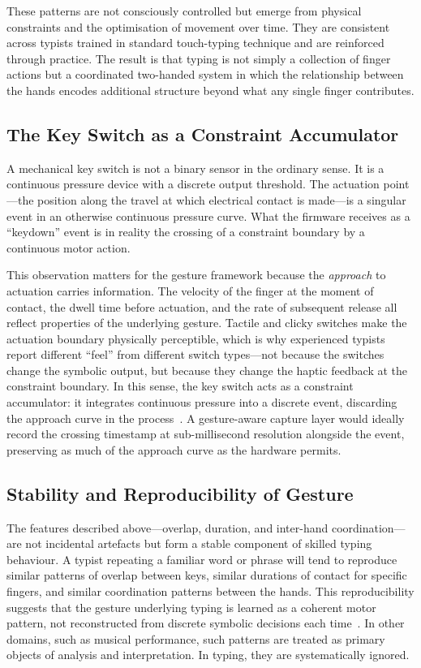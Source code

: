 \documentclass[11pt, a4paper]{article}
\begin{document}
These patterns are not consciously controlled but emerge from physical
constraints and the optimisation of movement over time. They are
consistent across typists trained in standard touch-typing technique and
are reinforced through practice. The result is that typing is not simply
a collection of finger actions but a coordinated two-handed system in
which the relationship between the hands encodes additional structure
beyond what any single finger contributes.

\subsection{The Key Switch as a Constraint Accumulator}

A mechanical key switch is not a binary sensor in the ordinary sense. It
is a continuous pressure device with a discrete output threshold. The
actuation point---the position along the travel at which electrical
contact is made---is a singular event in an otherwise continuous
pressure curve. What the firmware receives as a ``keydown'' event is in
reality the crossing of a constraint boundary by a continuous motor
action.

This observation matters for the gesture framework because the
\emph{approach} to actuation carries information. The velocity of the
finger at the moment of contact, the dwell time before actuation, and
the rate of subsequent release all reflect properties of the underlying
gesture. Tactile and clicky switches make the actuation boundary
physically perceptible, which is why experienced typists report different
``feel'' from different switch types---not because the switches change
the symbolic output, but because they change the haptic feedback at the
constraint boundary. In this sense, the key switch acts as a
constraint accumulator: it integrates continuous pressure into a
discrete event, discarding the approach curve in the
process~\cite{juarrero1999}. A
gesture-aware capture layer would ideally record the crossing timestamp
at sub-millisecond resolution alongside the event, preserving as much
of the approach curve as the hardware permits.

\subsection{Stability and Reproducibility of Gesture}

The features described above---overlap, duration, and inter-hand
coordination---are not incidental artefacts but form a stable component
of skilled typing behaviour. A typist repeating a familiar word or phrase
will tend to reproduce similar patterns of overlap between keys, similar
durations of contact for specific fingers, and similar coordination
patterns between the hands. This reproducibility suggests that the
gesture underlying typing is learned as a coherent motor pattern, not
reconstructed from discrete symbolic decisions each time~\cite{lashley1951}.
In other domains, such as musical performance, such patterns are treated
as primary objects of analysis and interpretation. In typing, they are
systematically ignored.
\end{document}
